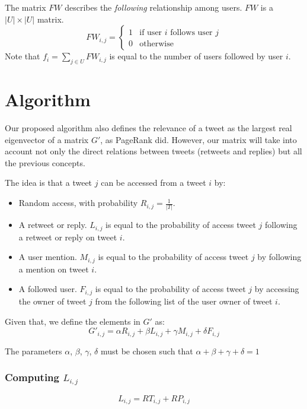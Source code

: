 \documentclass[12pt,a4paper]{article}
\begin{document}
The matrix $FW$ describes the \emph{following} relationship among users. $FW$ is a $|U| \times |U|$ matrix.
\begin{equation}
FW_{i,j} = \begin{cases}
1 & \text{if user } i \text{ follows user } j \\
0 & \text{otherwise}
\end{cases}
\end{equation}
Note that $f_i = \sum_{j \in U} FW_{i,j}$ is equal to the number of users followed by user $i$.

\section{Algorithm}
Our proposed algorithm also defines the relevance of a tweet as the largest real eigenvector of a matrix $G'$, as PageRank did. However, our matrix will take into account not only the direct relations between tweets (retweets and replies) but all the previous concepts.

The idea is that a tweet $j$ can be accessed from a tweet $i$ by:
\begin{itemize}
\item Random access, with probability $R_{i,j} = \frac{1}{|T|}$.
\item A retweet or reply. $L_{i,j}$ is equal to the probability of access tweet $j$ following a retweet or reply on tweet $i$.
\item A user mention. $M_{i,j}$ is equal to the probability of access tweet $j$ by following a mention on tweet $i$.
\item A followed user. $F_{i,j}$ is equal to the probability of access tweet $j$ by accessing the owner of tweet $j$ from the following list of the user owner of tweet $i$.
\end{itemize}

Given that, we define the elements in $G'$ as:
\begin{equation}\label{eq:tweetrank}
G'_{i,j} = \alpha R_{i,j} + \beta L_{i,j} + \gamma M_{i,j} + \delta F_{i,j} 
\end{equation}

The parameters $\alpha$, $\beta$, $\gamma$, $\delta$ must be chosen such that  $\alpha + \beta + \gamma + \delta = 1$

\subsubsection*{Computing $L_{i,j}$}
\begin{equation}
L_{i,j} = RT_{i,j} + RP_{i,j}
\end{equation}
\end{document}
